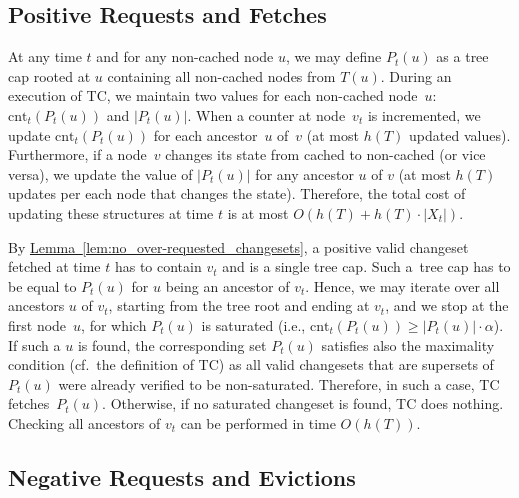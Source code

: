 \documentclass[sigconf,screen=true]{acmart}
\newcommand{\lref}[2][]{\hyperref[#2]{#1~\ref*{#2}}}
\newcommand{\ALG}{\textsc{TC}\xspace}
\newcommand{\cnt}{\textrm{cnt}}
\begin{document}
\subsection{Positive Requests and Fetches}
\label{sec:implementing_positive_counters}

At any time $t$ and for any non-cached node $u$, we may define $P_t(u)$ as a
tree cap rooted at $u$ containing all non-cached nodes from $T(u)$. During an
execution of \ALG, we maintain two values for each non-cached node~$u$:
$\cnt_t(P_t(u))$ and $|P_t(u)|$. When a counter at node~$v_t$ is incremented, we
update $\cnt_t(P_t(u))$ for each ancestor~$u$ of~$v$ (at most $h(T)$ updated
values). Furthermore, if a node~$v$ changes its state from cached to
non-cached (or vice versa), we update the value of $|P_t(u)|$ for any ancestor $u$
of $v$ (at most $h(T)$ updates per each node that changes the
state). Therefore, the total cost of updating these structures at time $t$ is
at most $O(h(T) + h(T) \cdot |X_t|)$.

By \lref[Lemma]{lem:no_over-requested_changesets}, a positive valid changeset
fetched at time $t$ has to contain $v_t$ and is a single tree cap. Such a~tree
cap has to be equal to $P_t(u)$ for $u$ being an ancestor of $v_t$. 
Hence, we may iterate over all
ancestors $u$ of $v_t$, starting from the tree root and ending at $v_t$, and
we stop at the first node~$u$, for which $P_t(u)$ is saturated (i.e.,
$\cnt_t(P_t(u)) \geq |P_t(u)| \cdot \alpha$). If such a $u$ is found, the
corresponding set $P_t(u)$ satisfies also the maximality condition (cf.~the
definition of \ALG) as all valid changesets that are supersets of $P_t(u)$
were already verified to be non-saturated. Therefore, in such a case, \ALG
fetches~$P_t(u)$. Otherwise, if no saturated changeset is found, \ALG does
nothing. Checking all ancestors of $v_t$ can be performed in time $O(h(T))$.

\subsection{Negative Requests and Evictions}
\label{sec:implementing_negative_counters}
\end{document}
